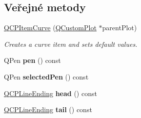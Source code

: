 \subsection*{Veřejné metody}
\begin{DoxyCompactItemize}
\item 
\hyperlink{classQCPItemCurve_ac9b7508bb5c8827e1a7a6199f8c82bec}{Q\+C\+P\+Item\+Curve} (\hyperlink{classQCustomPlot}{Q\+Custom\+Plot} $\ast$parent\+Plot)
\begin{DoxyCompactList}\small\item\em Creates a curve item and sets default values. \end{DoxyCompactList}\item 
\hypertarget{classQCPItemCurve_abc6321e55a9ba1a0c7df407843dfa252}{}Q\+Pen {\bfseries pen} () const \label{classQCPItemCurve_abc6321e55a9ba1a0c7df407843dfa252}

\item 
\hypertarget{classQCPItemCurve_abd8b8be5b13bc4dafec4c1758c281336}{}Q\+Pen {\bfseries selected\+Pen} () const \label{classQCPItemCurve_abd8b8be5b13bc4dafec4c1758c281336}

\item 
\hypertarget{classQCPItemCurve_afc067f0d1e60cd04812f2c2c7fdf36c3}{}\hyperlink{classQCPLineEnding}{Q\+C\+P\+Line\+Ending} {\bfseries head} () const \label{classQCPItemCurve_afc067f0d1e60cd04812f2c2c7fdf36c3}

\item 
\hypertarget{classQCPItemCurve_a9adddfcc5275be0cf27e3c0c31c37c1a}{}\hyperlink{classQCPLineEnding}{Q\+C\+P\+Line\+Ending} {\bfseries tail} () const \label{classQCPItemCurve_a9adddfcc5275be0cf27e3c0c31c37c1a}


\end{DoxyCompactItemize}
